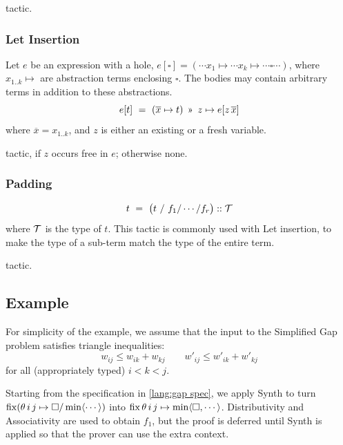\Obligations tactic.

\subsubsection{Let Insertion}

Let $e$ be an expression with a hole, $e[\square] = (\cdots x_1 \mapsto \cdots x_k\mapsto \cdots \square \cdots)$, 
where $x_{1..k}\mapsto$ are abstraction terms enclosing $\square$. The bodies may contain arbitrary terms
in addition to these abstractions.
%
\[e[t] ~=~ (\overline{x}\mapsto t) ~\applt~ z\mapsto e[z\,\overline{x}]\]
%
where $\overline{x}=x_{1..k}$, and $z$ is either an existing or a fresh variable.

\Obligations tactic, if $z$ occurs free in $e$; otherwise none.

\subsubsection{Padding}
\[t ~=~ \big(t~/~f_1/\cdots/f_r\big) :: \mathcal{T}\]
%
where $\mathcal{T}$ is the type of $t$. This tactic is commonly used with Let insertion,
to make the type of a sub-term match the type of the entire term.

\Obligations tactic.


\subsection{Example \hrulefill}

For simplicity of the example, we assume that the input to the Simplified Gap problem
satisfies triangle inequalities:
%
\begin{equation}
w_{ij} \leq w_{ik} + w_{kj} \qquad w'_{ij} \leq w'_{ik} + w'_{kj}
\label{equ:triangle}
\end{equation}
%
for all (appropriately typed) $i<k<j$.

\medskip
Starting from the specification in \eqref{lang:gap spec}, we apply Synth to turn
$\operatorname{fix} (\theta\,i\,j\mapsto\square/\min\langle\cdots\rangle)$ into $\operatorname{fix}\theta\,i\,j\mapsto\min\langle\square,\cdots\rangle$.
Distributivity and Associativity are used to obtain $f_1$, but the proof is deferred until
Synth is applied so that the prover can use the extra context.


